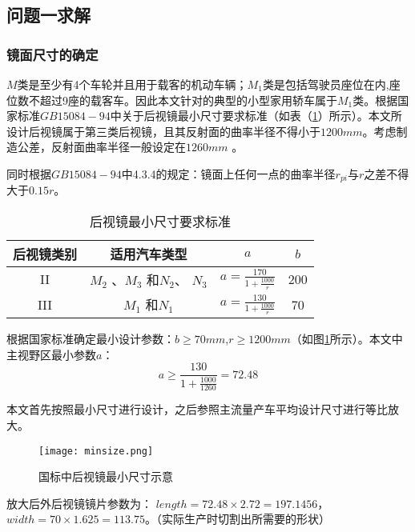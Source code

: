 \documentclass[withoutpreface,bwprint]{cumcmthesis} %
\begin{document}
\subsection{问题一求解}

\subsubsection{镜面尺寸的确定}
\par $M$类是至少有4个车轮并且用于载客的机动车辆；$M_1$类是包括驾驶员座位在内,座位数不超过9座的载客车。因此本文针对的典型的小型家用轿车属于$M_1$类。根据国家标准$GB 15084-94$中关于后视镜最小尺寸要求标准（如表（\ref{后视镜最小尺寸要求标准}）所示）。本文所设计后视镜属于第三类后视镜，且其反射面的曲率半径不得小于$1200mm$。考虑制造公差，反射面曲率半径一般设定在$1260mm$ 。

\par 同时根据$GB 15084-94$中4.3.4的规定：镜面上任何一点的曲率半径$r_{pi}$与$r$之差不得大于$0.15r$。

\begin{table}[!htbp]
\centering
\caption{后视镜最小尺寸要求标准}
\label{后视镜最小尺寸要求标准}
\begin{tabular}{cccc}
\toprule
后视镜类别 & 适用汽车类型 & $a$ & $b$	\\ \midrule
 II	 & $M_2$ 、$M_3$ 和$N_2$、 $N_3$ &  $a =  \frac{170}{1+\frac{1000}{r}}$& 200\\ 
III & $M_1$ 和$N_1$& $a =  \frac{130}{1+\frac{1000}{r}}$&  70\\ 
\bottomrule 
\end{tabular}
\end{table}

\par 根据国家标准确定最小设计参数：$b \geqslant 70mm$,$r \geqslant 1200mm$（如图\ref{fig:后视镜最小尺寸示意}所示）。本文中主视野区最小参数$a$：
$$a \geqslant \frac{130}{1+\frac{1000}{1260}} = 72.48$$

\par 本文首先按照最小尺寸进行设计，之后参照主流量产车平均设计尺寸进行等比放大。
\begin{figure}[h]
\small
\centering
\texttt{[image: minsize.png]}
\caption{国标中后视镜最小尺寸示意} \label{fig:后视镜最小尺寸示意}
\end{figure}

\par 放大后外后视镜镜片参数为：
$length = 72.48\times 2.72 = 197.1456$，            
$width = 70 \times 1.625 = 113.75$。（实际生产时切割出所需要的形状）
\end{document}

